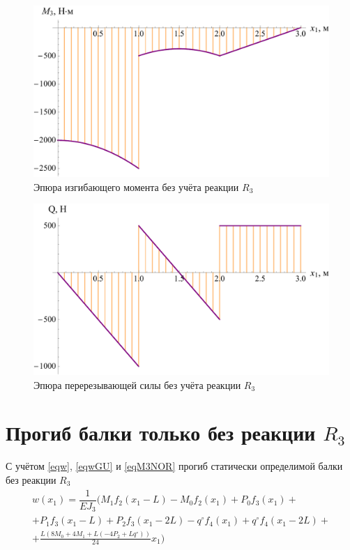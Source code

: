 \documentclass[12pt, a4paper]{article}
\begin{document}
	\newpage
	
	\begin{figure}[!h]
		\centering
		\includegraphics[width=0.7\linewidth]{plot-8}
		\caption{Эпюра изгибающего момента без учёта реакции $R_3$}
	\end{figure} 
	
	\begin{figure}[!h]
		\centering
		\includegraphics[width=0.7\linewidth]{plot-9}
		\caption{Эпюра перерезывающей силы без учёта реакции $R_3$}
	\end{figure}
	
	\vspace{-0.75em}
	
	
	\section{Прогиб балки только без реакции $R_3$} 
	
	С учётом \eqref{eqw}, \eqref{eqwGU} и \eqref{eqM3NOR} прогиб статически определимой балки без реакции $R_3$
	\begin{equation} 
		\begin{split}
			w(x_1) = \dfrac{1}{E J_3} \bigg( M_1 f_2(x_1 - L) - M_0 f_2(x_1) + P_0 f_3(x_1) + \\ + P_1 f_3(x_1 - L) + P_2 f_3(x_1 - 2L) - q^{\circ} f_4(x_1) + q^{\circ} f_4(x_1 - 2L) + \\ +  \frac{L (8 M_0 + 4 M_1 + L (-4 P_2 + L q^{\circ}))}{24} x_1 \bigg)
		\end{split}
		\label{eqw0}
	\end{equation}
	
\end{document}
